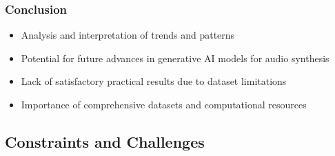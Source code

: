 \begin{frame}
    \frametitle{Conclusion}

    \begin{itemize}
        \item Analysis and interpretation of trends and patterns
        \item Potential for future advances in generative AI models for audio synthesis
        \item Lack of satisfactory practical results due to dataset limitations
        \item Importance of comprehensive datasets and computational resources
    \end{itemize}

\end{frame}

\subsection{Constraints and Challenges}

